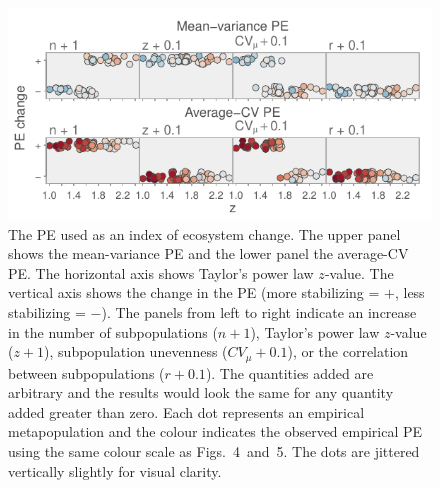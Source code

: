 \begin{figure}[htbp]
  \centering
  \includegraphics[width=5in]{prophets/PE-as-index.pdf}
  \caption[The PE used as an index of ecosystem change.]{ The PE used as an index of ecosystem change.  The upper panel
    shows the mean-variance PE and the lower panel the average-CV PE.  The
    horizontal axis shows Taylor's power law $z$-value.  The vertical axis
    shows the change in the PE (more stabilizing = $+$, less stabilizing =
    $-$).  The panels from left to right indicate an increase in the number of
    subpopulations ($n + 1$), Taylor's power law $z$-value ($z + 1$),
    subpopulation unevenness ($CV_{\mu} + 0.1$), or the correlation between
    subpopulations ($r + 0.1$). The quantities added are arbitrary and the
    results would look the same for any quantity added greater than zero.  Each
    dot represents an empirical metapopulation and the colour indicates the
    observed empirical PE using the same colour scale as Figs.~4~and~5. The dots
    are jittered vertically slightly for visual clarity.  }
  \label{fig:PE-as-an-index}
\end{figure}


%
